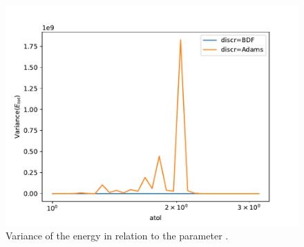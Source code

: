 \documentclass{report}
\begin{document}
\begin{figure}[h]
\centering
\begin{minipage}[b]{0.45\textwidth}
\centering
\includegraphics[width=\textwidth]{../Plots/Task4/Figure_404}
\caption{Variance of the energy in relation to the parameter .}
\label{pl:stability3}
\end{minipage}
\end{figure}
\end{document}
